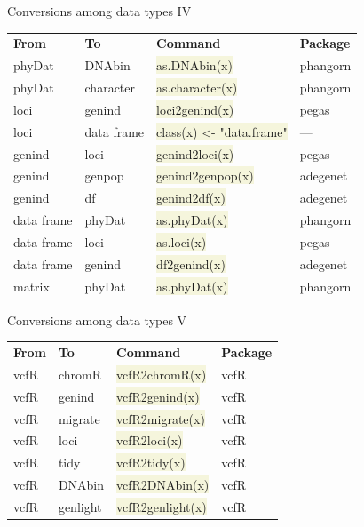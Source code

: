 \documentclass[compress, xelatex, 11pt, xcolor=svgnames, aspectratio=169,
	hyperref={
		bookmarks=true,
		unicode=true,
		colorlinks=true,
		pdftitle={Molecular data in R},
		plainpages=false,
		pdfauthor={Vojtech Zeisek},
		pdfsubject={Course about phylogeny and evolution in R},
		pdfcreator={XeLaTeX},
		pdfkeywords={R, evolution, phylogeny, molecular data},
		linkcolor=Crimson, %
		anchorcolor=Magenta, %
		citecolor=Magenta, %
		filecolor=Magenta, %
		menucolor=Magenta, %
		urlcolor=DodgerBlue, %
		},
	url={hyphens, lowtilde} %
	]{beamer}
\renewcommand{\texttt}[1]{\colorbox{Beige}{{\ttfamily #1}}}
\begin{document}
\begin{frame}{Conversions among data types IV}
	\begin{tabular}{llll}
		\textbf{From} & \textbf{To} & \textbf{Command} & \textbf{Package}\\
		phyDat & DNAbin & \texttt{as.DNAbin(x)} & phangorn\\
		phyDat & character & \texttt{as.character(x)} & phangorn\\
		loci & genind & \texttt{loci2genind(x)} & pegas\\
		loci & data frame & \texttt{class(x) <- "data.frame"} & --- \\
		genind & loci & \texttt{genind2loci(x)} & pegas\\
		genind & genpop & \texttt{genind2genpop(x)} & adegenet\\
		genind & df & \texttt{genind2df(x)} & adegenet\\
		data frame & phyDat & \texttt{as.phyDat(x)} & phangorn\\
		data frame & loci & \texttt{as.loci(x)} & pegas\\
		data frame & genind & \texttt{df2genind(x)} & adegenet\\
		matrix & phyDat & \texttt{as.phyDat(x)} & phangorn
	\end{tabular}
\end{frame}

\begin{frame}{Conversions among data types V}
	\begin{tabular}{llll}
		\textbf{From} & \textbf{To} & \textbf{Command} & \textbf{Package}\\
		vcfR & chromR & \texttt{vcfR2chromR(x)} & vcfR\\
		vcfR & genind & \texttt{vcfR2genind(x)} & vcfR\\
		vcfR & migrate & \texttt{vcfR2migrate(x)} & vcfR\\
		vcfR & loci & \texttt{vcfR2loci(x)} & vcfR\\
		vcfR & tidy & \texttt{vcfR2tidy(x)} & vcfR\\
		vcfR & DNAbin & \texttt{vcfR2DNAbin(x)} & vcfR\\
		vcfR & genlight & \texttt{vcfR2genlight(x)} & vcfR
	\end{tabular}
\end{frame}
\end{document}
